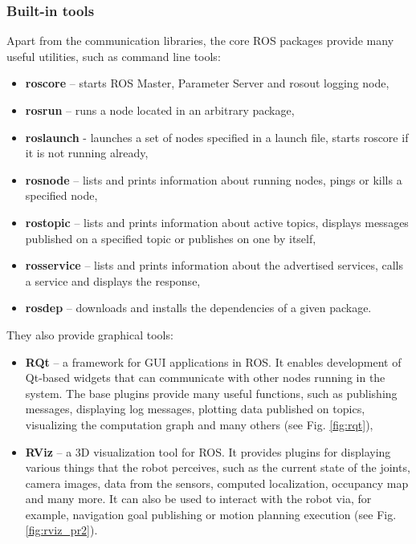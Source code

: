\documentclass[english,inz,shortabstract]{iithesis}
\begin{document}
\pagebreak

		\subsubsection{Built-in tools}
		Apart from the communication libraries, the core ROS packages provide many useful utilities, such as command line tools:

		\begin{itemize}[itemsep=0pt, parsep=2pt, topsep=0pt]
			\item \textbf{roscore} -- starts ROS Master, Parameter Server and \textsf{rosout} \cite{ros:rosout} logging node,
			\item \textbf{rosrun} -- runs a node located in an arbitrary package,
			\item \textbf{roslaunch} - launches a set of nodes specified in a launch file, starts roscore if it is not running already,
			\item \textbf{rosnode} -- lists and prints information about running nodes, pings or kills a specified node,
			\item \textbf{rostopic} -- lists and prints information about active topics, displays messages published on a specified topic or publishes on one by itself,
			\item \textbf{rosservice} -- lists and prints information about the advertised services, calls a service and displays the response,
			\item \textbf{rosdep} -- downloads and installs the dependencies of a given package.
		\end{itemize}
		They also provide graphical tools:

		\begin{itemize}[itemsep=0pt, parsep=2pt, topsep=0pt]
			\item \textbf{RQt} -- a framework for GUI applications in ROS. It enables development of Qt-based widgets that can communicate with other nodes running in the system. The base plugins provide many useful functions, such as publishing messages, displaying log messages, plotting data published on topics, visualizing the computation graph and many others (see Fig. \ref{fig:rqt}),
			\item \textbf{RViz} -- a 3D visualization tool for ROS. It provides plugins for displaying various things that the robot perceives, such as the current state of the joints, camera images, data from the sensors, computed localization, occupancy map and many more. It can also be used to interact with the robot via, for example, navigation goal publishing or motion planning execution (see Fig. \ref{fig:rviz_pr2}).
		\end{itemize}
\end{document}
